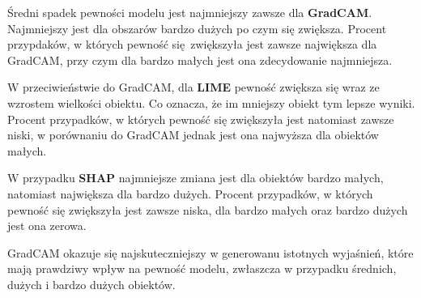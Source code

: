Średni spadek pewności modelu jest najmniejszy zawsze dla \textbf{GradCAM}.
Najmniejszy jest dla obszarów bardzo dużych po czym się zwiększa.
Procent przypdaków, w których pewność się zwiększyła jest zawsze największa dla GradCAM, przy czym dla bardzo małych jest ona zdecydowanie najmniejsza.

W przeciwieństwie do GradCAM, dla \textbf{LIME} pewność zwiększa się wraz ze wzrostem wielkości obiektu.
Co oznacza, że im mniejszy obiekt tym lepsze wyniki.
Procent przypadków, w których pewność się zwiększyła jest natomiast zawsze niski, w porównaniu do GradCAM jednak jest ona najwyższa dla obiektów małych.

W przypadku \textbf{SHAP} najmniejsze zmiana jest dla obiektów bardzo małych, natomiast największa dla bardzo dużych.
Procent przypadków, w których pewność się zwiększyła jest zawsze niska, dla bardzo małych oraz bardzo dużych jest ona zerowa.

GradCAM okazuje się najskuteczniejszy w generowanu istotnych wyjaśnień, które mają prawdziwy wpływ na pewność modelu, zwłaszcza w przypadku średnich, dużych i bardzo dużych obiektów.

\vspace{1cm}

